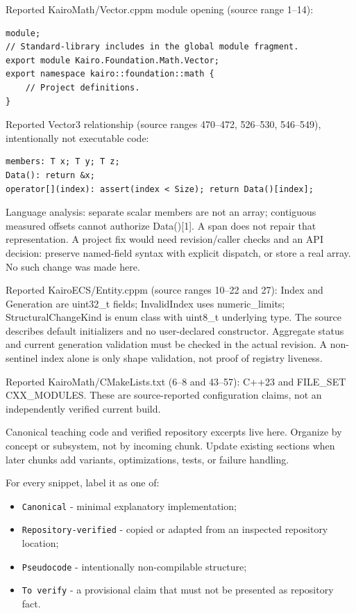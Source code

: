 Reported KairoMath/Vector.cppm module opening (source range 1--14):

\begin{verbatim}
module;
// Standard-library includes in the global module fragment.
export module Kairo.Foundation.Math.Vector;
export namespace kairo::foundation::math {
    // Project definitions.
}
\end{verbatim}

Reported Vector3 relationship (source ranges 470--472, 526--530, 546--549), intentionally not executable code:

\begin{verbatim}
members: T x; T y; T z;
Data(): return &x;
operator[](index): assert(index < Size); return Data()[index];
\end{verbatim}

Language analysis: separate scalar members are not an array; contiguous measured offsets cannot authorize Data(){[}1{]}. A span does not repair that representation. A project fix would need revision/caller checks and an API decision: preserve named-field syntax with explicit dispatch, or store a real array. No such change was made here.

Reported KairoECS/Entity.cppm (source ranges 10--22 and 27): Index and Generation are uint32\_t fields; InvalidIndex uses numeric\_limits; StructuralChangeKind is enum class with uint8\_t underlying type. The source describes default initializers and no user-declared constructor. Aggregate status and current generation validation must be checked in the actual revision. A non-sentinel index alone is only shape validation, not proof of registry liveness.

Reported KairoMath/CMakeLists.txt (6--8 and 43--57): C++23 and FILE\_SET CXX\_MODULES. These are source-reported configuration claims, not an independently verified current build.

Canonical teaching code and verified repository excerpts live here. Organize by concept or subsystem, not by incoming chunk. Update existing sections when later chunks add variants, optimizations, tests, or failure handling.

For every snippet, label it as one of:

\begin{itemize}
\tightlist
\item
  \texttt{Canonical} - minimal explanatory implementation;
\item
  \texttt{Repository-verified} - copied or adapted from an inspected repository location;
\item
  \texttt{Pseudocode} - intentionally non-compilable structure;
\item
  \texttt{To\ verify} - a provisional claim that must not be presented as repository fact.
\end{itemize}

